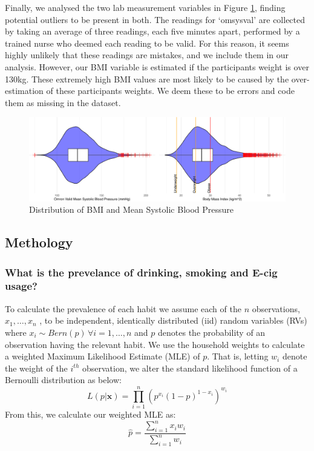 \documentclass[
  11pt,
]{article}
\begin{document}
Finally, we analysed the two lab measurement variables in Figure
\ref{fig:output-distribution-plots}, finding potential outliers to be
present in both. The readings for `omsysval' are collected by taking an
average of three readings, each five minutes apart, performed by a
trained nurse who deemed each reading to be valid. For this reason, it
seems highly unlikely that these readings are mistakes, and we include
them in our analysis. However, our BMI variable is estimated if the
participants weight is over 130kg. These extremely high BMI values are
most likely to be caused by the over-estimation of these participants
weights. We deem these to be errors and code them as missing in the
dataset.

\begin{figure}[H]
\includegraphics{Coursework_files/figure-latex/output-distribution-plots-1} \caption{Distribution of BMI and Mean Systolic Blood Pressure}\label{fig:output-distribution-plots}
\end{figure}

\subsection{Methology}\label{methology}

\subsubsection{What is the prevelance of drinking, smoking and E-cig
usage?}\label{what-is-the-prevelance-of-drinking-smoking-and-e-cig-usage}

To calculate the prevalence of each habit we assume each of the \(n\)
observations, \(x_1,…,x_n\) , to be independent, identically distributed
(iid) random variables (RVs) where
\(x_i \sim Bern(p)\, \forall i=1,…,n\) and \(p\) denotes the probability
of an observation having the relevant habit. We use the household
weights to calculate a weighted Maximum Likelihood Estimate (MLE) of
\(p\). That is, letting \(w_i\) denote the weight of the \(i^{th}\)
observation, we alter the standard likelihood function of a Bernoulli
distribution as below:
\[L(p|\textbf{x}) = \prod_{i = 1}^{n} (p^{x_i}(1-p)^{1-x_i})^{w_i}\]
From this, we calculate our weighted MLE as:
\[\widehat{p} = \frac{\sum_{i=1}^{n} x_iw_i}{\sum_{i=1}^{n} w_i}\]
\end{document}
